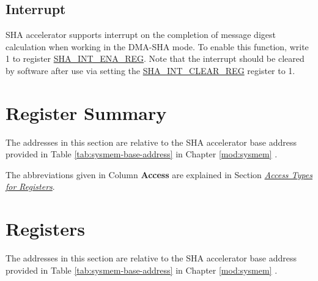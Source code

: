 \documentclass[main\_\_EN.tex]{subfiles}
\begin{document}
\subsection{Interrupt}

SHA accelerator supports interrupt on the completion of message digest calculation when working in the DMA-SHA mode. To enable this function, write 1 to register \hyperref[regdesc:SHAINTENAREG]{SHA\_INT\_ENA\_REG}. Note that the interrupt should be cleared by software after use via setting the \hyperref[regdesc:SHAINTCLEARREG]{SHA\_INT\_CLEAR\_REG} register to 1.


\hypertarget{sha-reg-summ}{}
\section{Register Summary} \label{sec:sha-reg-summ} 

The addresses in this section are relative to the SHA accelerator base address provided in Table \ref{tab:sysmem-base-address} in Chapter \ref{mod:sysmem} \textit{}.

The abbreviations given in Column \textbf{Access} are explained in Section \hyperref[glossary-access-types]{\textit{Access Types for Registers}}.



\section{Registers}

The addresses in this section are relative to the SHA accelerator base address provided in Table \ref{tab:sysmem-base-address} in Chapter \ref{mod:sysmem} \textit{}.


\end{document}
